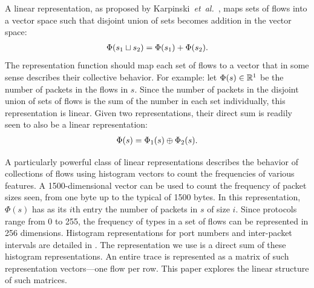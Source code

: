 \documentclass[conference]{IEEEtran}
\begin{document}
A linear representation, as proposed by Karpinski~\emph{et~al.}~\cite{Karpinski08}, maps sets of flows into a vector space such that disjoint union of sets becomes addition in the vector space:
\begin{align}
  \Phi(s_1 \sqcup s_2) = \Phi(s_1) + \Phi(s_2).
\end{align}
The representation function should map each set of flows to a vector that in some sense describes their collective behavior.
For example: let $\Phi(s) \in \mathbb{R}^1$ be the number of packets in the flows in $s$.
Since the number of packets in the disjoint union of sets of flows is the sum of the number in each set individually, this representation is linear.
Given two representations, their direct sum is readily seen to also be a linear representation:
\begin{align}
  \Phi(s) = \Phi_1(s) \oplus \Phi_2(s).
\end{align}

A particularly powerful class of linear representations describes the behavior of collections of flows using histogram vectors to count the frequencies of various features.
A 1500-dimensional vector can be used to count the frequency of packet sizes seen, from one byte up to the typical  of 1500 bytes.
In this representation, $\Phi(s)$ has as its $i$th entry the number of packets in $s$ of size $i$.
Since  protocols range from 0 to 255, the frequency of types in a set of flows can be represented in 256 dimensions.
Histogram representations for port numbers and inter-packet intervals are detailed in .
The representation we use is a direct sum of these histogram representations.
An entire trace is represented as a matrix of such representation vectors---one flow per row.
This paper explores the linear structure of such matrices.

\end{document}
